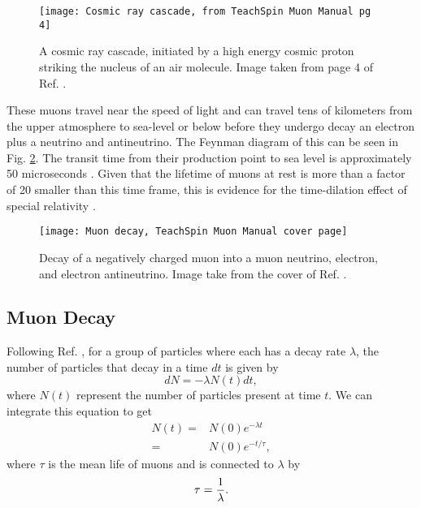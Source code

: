\documentclass[11pt,letterpaper]{article}
\begin{document}
\begin{figure}
\centerline{\texttt{[image: Cosmic ray cascade, from TeachSpin Muon Manual pg 4]}}
\caption{A cosmic ray cascade, initiated by a high energy cosmic proton striking the nucleus of an air molecule. Image taken from page 4 of Ref. \cite{Coan}.} \label{Cosmic ray cascade}
\end{figure}


These muons travel near the speed of light and can travel tens of kilometers from the upper atmosphere to sea-level or below before they undergo decay an electron plus a neutrino and antineutrino. The Feynman diagram of this can be seen in Fig. \ref{Feynman diagram}. The transit time from their production point to sea level is approximately 50 microseconds \cite{Coan}. Given that the lifetime of muons at rest is more than a factor of 20 smaller than this time frame, this is evidence for the time-dilation effect of special relativity \cite{Frauenfelder}.

\begin{figure}
\centerline{\texttt{[image: Muon decay, TeachSpin Muon Manual cover page]}}
\caption{Decay of a negatively charged muon into a muon neutrino, electron, and electron antineutrino. Image take from the cover of Ref. \cite{Coan}.} \label{Feynman diagram}
\end{figure}


\subsection{Muon Decay}

Following Ref. \cite{Frauenfelder}, for a group of particles where each has a decay rate $\lambda$, the number of particles that decay in a time $dt$ is given by
\begin{equation}
    dN = - \lambda N(t) dt ,
\end{equation}
where $N(t)$ represent the number of particles present at time $t$. We can integrate this equation to get
\begin{align}
    N(t) = & N(0) e^{- \lambda t} \\
    = & N(0) e^{- t / \tau} ,
\end{align}
where $\tau$ is the mean life of muons and is connected to $\lambda$ by
\begin{equation}
    \tau = {1 \over\lambda} .
\end{equation}
\end{document}
